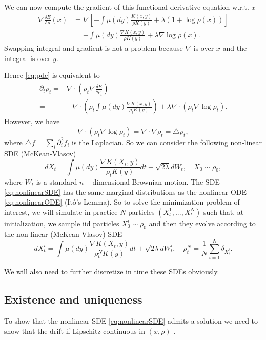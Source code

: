 \documentclass[a4paper]{article}
\newcommand{\variation}[1]{\ensuremath{\frac{\delta E}{\delta #1}}}
\begin{document}
We can now compute the gradient of this functional derivative equation w.r.t. $x$
\begin{align*}
\nabla\frac{\delta E}{\delta\rho}\left(x\right) & = \nabla\left[-\int\mu\left(dy\right)\frac{ K(x,y)}{\rho K(y)}+\lambda(1 + \log\rho\left(x\right))\right]\\
&= -\int\mu\left(dy\right)\frac{\nabla K(x,y)}{\rho K(y)}+\lambda\nabla\log\rho\left(x\right).
\end{align*}
Swapping integral and gradient is not a problem because $\nabla$ is over $x$ and the integral is over $y$.

Hence \eqref{eq:pde} is equivalent to
\begin{align*}
\partial_{t}\rho_{t}= & \nabla\cdot\left(\rho_{t}\nabla\variation{\rho_{t}}\right)\\
= & -\nabla\cdot\left(\rho_{t}\int\mu\left(dy\right)\frac{\nabla K(x,y)}{\rho_{t}K(y)}\right)+\lambda\nabla\cdot\left(\rho_{t}\nabla\log\rho_{t}\right).
\end{align*}
However, we have
\[
\nabla\cdot\left(\rho_{t}\nabla\log\rho_{t}\right)=\nabla\cdot\nabla\rho_{t}=\triangle\rho_{t},
\]
where $\triangle f=\sum_{i}\partial_{i}^{2}f_{i}$ is the Laplacian.
So we can consider the following non-linear SDE (McKean-Vlasov) 
\begin{equation}
dX_{t}=\int\mu\left(dy\right)\frac{\nabla K(X_{t},y)}{\rho_{t}K(y)}dt+\sqrt{2\lambda}dW_{t},\quad X_{0}\sim\rho_{0},\label{eq:nonlinearSDE}
\end{equation}
where $W_{t}$ is a standard $n-$dimensional Brownian motion.
The SDE \eqref{eq:nonlinearSDE} has the same marginal distributions as the nonlinear ODE \eqref{eq:nonlinearODE} (It\^o's Lemma).
So to solve the minimization problem of interest, we will simulate in practice $N$ particles $(X_{t}^{1},...,X_{t}^{N})$ such that, at initialization, we sample iid particles $X_{0}^{i}\sim\rho_{0}$ and then they evolve according to the non-linear (McKean-Vlasov) SDE
\[
dX_{t}^{i}=\int\mu\left(dy\right)\frac{\nabla K(X_{t},y)}{\rho_{t}^{N}K(y)}dt+\sqrt{2\lambda}dW_{t}^{i},\quad\rho_{t}^{N}=\frac{1}{N}\sum_{i=1}^{N}\delta_{X_{t}^{i}}.
\]

We will also need to further discretize in time these SDEs obviously.

\subsection{Existence and uniqueness}
To show that the nonlinear SDE \eqref{eq:nonlinearSDE} admits a solution we need to show that the drift if Lipschitz continuous in $(x, \rho)$ \citep{jourdain2007nonlinear}.
\end{document}
